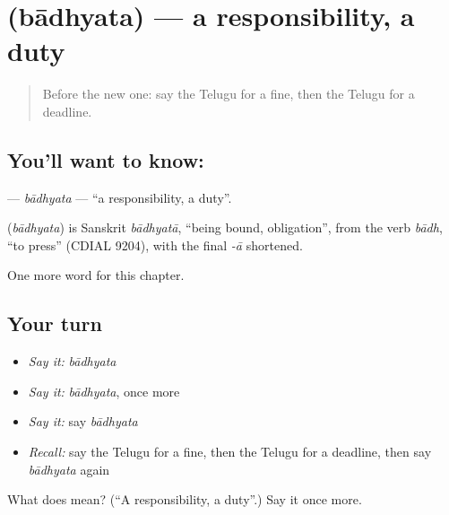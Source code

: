 \section[\texorpdfstring{\te{బాధ్యత} (bādhyata)}{బాధ్యత (bādhyata)}]{ (bādhyata) — a responsibility, a duty}

\label{lesson:TE-C196-badhyata}



\begin{quote}
Before the new one: say the Telugu for a fine, then the Telugu for a deadline.
\end{quote}

\subsection*{You'll want to know: }
\textbf{} — \emph{bādhyata} — \textquotedblleft{}a responsibility, a duty\textquotedblright{}.

\begin{cousinweb}
\textbf{} (\emph{bādhyata}) is Sanskrit \emph{bādhyatā}, \textquotedblleft{}being bound, obligation\textquotedblright{}, from the verb \emph{bādh}, \textquotedblleft{}to press\textquotedblright{} (CDIAL 9204), with the final \emph{-ā} shortened.
\end{cousinweb}

\begin{grammarlens}[title={What you've built}]
One more word for this chapter.
\end{grammarlens}

\subsection*{Your turn}
\begin{itemize}
\raggedright
  \item \emph{Say it:} \emph{bādhyata}
  \item \emph{Say it:} \emph{bādhyata}, once more
  \item \emph{Say it:} say \emph{bādhyata}
  \item \emph{Recall:} say the Telugu for a fine, then the Telugu for a deadline, then say \emph{bādhyata} again
\end{itemize}

\begin{tcolorbox}[breakable,colback=teal!4,colframe=teal!35!black,title={Before you move on}]
What does  mean? (\textquotedblleft{}A responsibility, a duty\textquotedblright{}.) Say it once more.
\end{tcolorbox}
